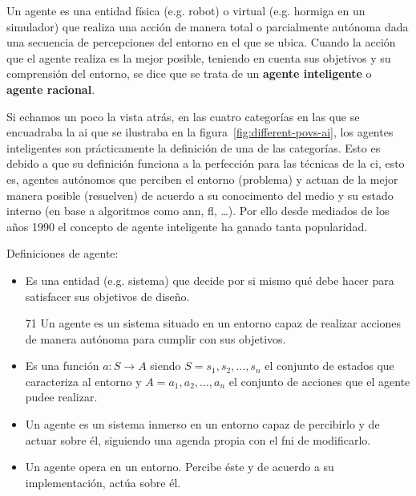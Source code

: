 Un agente es una entidad física (e.g. robot) o virtual (e.g. hormiga en un simulador) que realiza una acción de manera total o parcialmente autónoma dada una secuencia de percepciones del entorno en el que se ubica. Cuando la acción que el agente realiza es la mejor posible, teniendo en cuenta sus objetivos y su comprensión del entorno, se dice que se trata de un \textbf{agente inteligente} o \textbf{agente racional}.

Si echamos un poco la vista atrás, en las cuatro categorías en las que se encuadraba la \ac{ai} que se ilustraba en la figura~\ref{fig:different-povs-ai}, los agentes inteligentes son prácticamente la definición de una de las categorías. Esto es debido a que su definición funciona a la perfección para las técnicas de la \ac{ci}, esto es, agentes autónomos que perciben el entorno (problema) y actuan de la mejor manera posible (resuelven) de acuerdo a su conocimento del medio y su estado interno (en base a algoritmos como \ac{ann}, \ac{fl}, \ldots). Por ello desde mediados de los años 1990 el concepto de agente inteligente ha ganado tanta popularidad.

Definiciones de agente:

\begin{itemize}
	\item Es una entidad (e.g. sistema) que decide por si mismo qué debe hacer para satisfacer sus objetivos de diseño.
	\item [71] Un agente es un sistema situado en un entorno capaz de realizar acciones de manera autónoma para cumplir con sus objetivos.
	\item Es una función $a: S \rightarrow A$ siendo $S = {s_1, s_2, \ldots, s_n}$ el conjunto de estados que caracteriza al entorno y $A = {a_1, a_2, \ldots, a_n}$ el conjunto de acciones que el agente pudee realizar.
	\item Un agente es un sistema inmerso en un entorno capaz de percibirlo y de actuar sobre él, siguiendo una agenda propia con el fni de modificarlo.
	\item Un agente opera en un entorno. Percibe éste y de acuerdo a su implementación, actúa sobre él.
\end{itemize}


